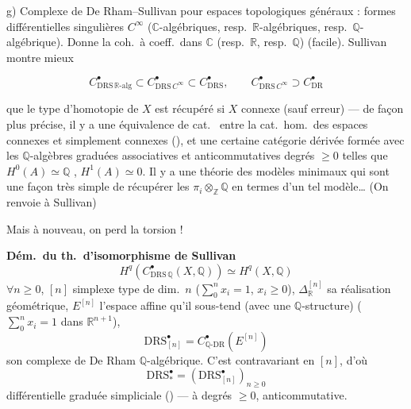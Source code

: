 \documentclass[11pt,a4paper]{article}
\begin{document}
g) Complexe de De Rham–Sullivan pour espaces topologiques généraux : formes différentielles singulières $C^\infty$ \struck{\ill{}} \struck{\ill{}} ($\mathbb{C}$-algébriques, resp.\ $\mathbb{R}$-algébriques, resp.\ $\mathbb{Q}$-algébrique). Donne la coh.\ à coeff.\ dans $\mathbb{C}$ (resp.\ $\mathbb{R}$, resp.\ $\mathbb{Q}$) (facile). Sullivan montre mieux

\[
C^\bullet_{\mathrm{DRS}\,\mathbb{R}\text{-alg}} \subset C^\bullet_{\mathrm{DRS}\,C^\infty} \subset C^\bullet_{\mathrm{DRS}},
\qquad C^\bullet_{\mathrm{DRS}\,C^\infty} \supset C^\bullet_{\mathrm{DR}}
\]

que le  type d'homotopie de $X$ est récupéré  si $X$ connexe (sauf erreur) — de façon plus précise, il y a une équivalence  de cat.\ \struck{\ill{}}  entre la cat.\ hom.\ des espaces connexes et simplement connexes (\ill{}), et une certaine catégorie dérivée formée avec les $\mathbb{Q}$-algèbres graduées \struck{\ill{}} associatives et anticommutatives   degrés $\geq 0$ telles que $H^0(A) \simeq \mathbb{Q}$ \struck{\ill{}}, $H^1(A) \simeq 0$. Il y a une théorie des modèles minimaux  qui sont une façon  très simple de récupérer les $\pi_i \otimes_{\mathbb{Z}} \mathbb{Q}$ en termes d'un tel modèle… (On renvoie à Sullivan)

Mais à nouveau, on perd la torsion !

\textbf{Dém.\ du th.\ d'isomorphisme de Sullivan}
\[ H^q(C^\bullet_{\mathrm{DRS}\,\mathbb{Q}}(X,\mathbb{Q})) \simeq H^q(X,\mathbb{Q}) \]
$\forall n \geq 0$, $[n]$ simplexe type de dim.\ $n$ \quad ($\sum_0^n x_i = 1$, $x_i \geq 0$), $\Delta^{[n]}_{\mathbb{R}}$ sa réalisation géométrique, $E^{[n]}$ l'espace affine qu'il sous-tend (avec une $\mathbb{Q}$-structure) \quad ($\sum_0^n x_i = 1$ dans $\mathbb{R}^{n+1}$),
\[ \mathrm{DRS}^\bullet_{[n]} = C^\bullet_{\mathbb{Q}\text{-DR}}(E^{[n]}) \]
son complexe de De Rham $\mathbb{Q}$-algébrique. C'est contravariant en $[n]$, d'où
\[ \mathrm{DRS}^{\bullet}_{*} = (\mathrm{DRS}^\bullet_{[n]})_{n \geq 0} \]
 différentielle graduée \struck{\ill{}} simpliciale () — à degrés $\geq 0$, anticommutative.
\end{document}
